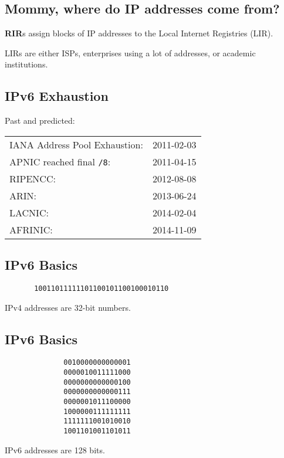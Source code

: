 \documentclass[xga]{xdvislides}
\begin{document}
\subsection{Mommy, where do IP addresses come from?}
\vspace*{\fill}
\begin{center}
{\bf RIR}s assign blocks of IP addresses to the Local Internet Registries (LIR).
\\
\vspace{.5in}

LIRs are either ISPs, enterprises using a lot of addresses, or academic
institutions.
\end{center}
\vspace*{\fill}

\subsection{IPv6 Exhaustion}
Past and predicted: \\

\begin{tabular}{l r}
IANA Address Pool Exhaustion: & 2011-02-03 \\
APNIC reached final {\tt /8}: & 2011-04-15 \\
RIPENCC: & 2012-08-08 \\
ARIN: & 2013-06-24 \\
LACNIC: & 2014-02-04 \\
AFRINIC: & 2014-11-09 \\
\end{tabular}

\subsection{IPv6 Basics}
\vspace{.5in}
\Hugesize
\begin{center}
\begin{verbatim}
       10011011111101100101100100010110
\end{verbatim}
\vspace{.5in}
IPv4 addresses are 32-bit numbers.
\end{center}
\Normalsize


\subsection{IPv6 Basics}
\Hugesize
\begin{center}
\begin{verbatim}
              0010000000000001
              0000010011111000
              0000000000000100
              0000000000000111
              0000001011100000
              1000000111111111
              1111111001010010
              1001101001101011
\end{verbatim}
\vspace{.5in}
IPv6 addresses are 128 bits.
\end{center}
\Normalsize
\end{document}
